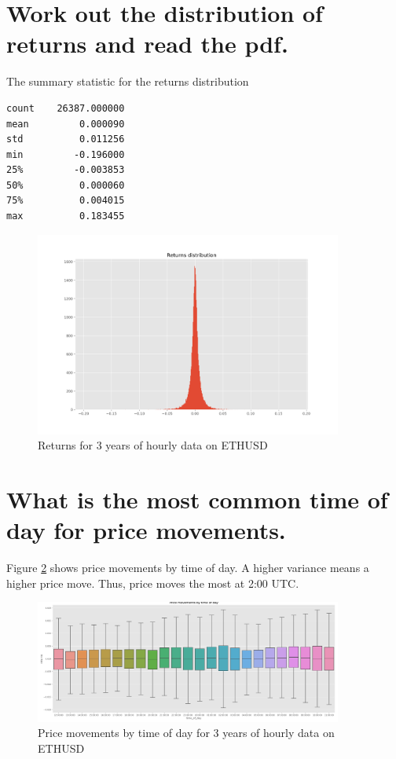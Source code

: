 \section{ Work out the distribution of returns and read the pdf.}
The summary statistic for the returns distribution
\begin{verbatim}
count    26387.000000
mean         0.000090
std          0.011256
min         -0.196000
25%         -0.003853
50%          0.000060
75%          0.004015
max          0.183455
\end{verbatim}

\begin{figure}
\center
\includegraphics[width=0.9\textwidth]{fig/ret.png}
\caption{Returns for 3 years of hourly data on ETHUSD}
\label{fig:ret}
\end{figure}


\section{ What is the most common time of day for price movements.}

Figure \ref{fig:pm} shows price movements by time of day. A higher variance means a higher price move. Thus, price moves the most at 2:00 UTC.
\begin{figure}
\center
\includegraphics[width=0.9\textwidth]{fig/pm.png}
\caption{Price movements by time of day for 3 years of hourly data on ETHUSD}
\label{fig:pm}
\end{figure}
 
